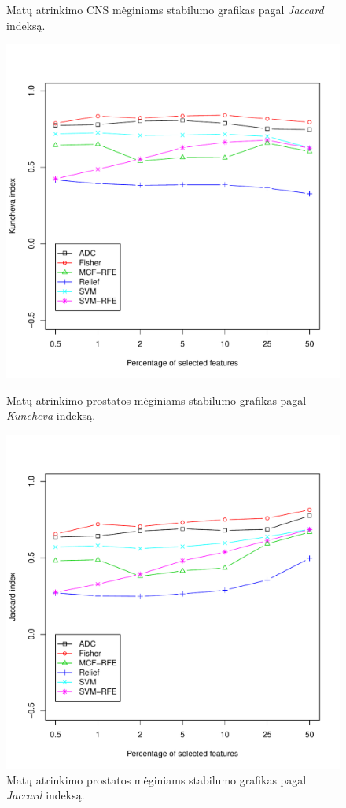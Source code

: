 \begin{figure}[H]
\begin{minipage}[b]{0.47\linewidth}
\caption{Matų atrinkimo CNS mėginiams stabilumo grafikas pagal \textit{Jaccard} indeksą.}
\label{fig:robj_cns}
\end{minipage}
\hspace{0.2cm}
\begin{minipage}[b]{0.47\linewidth}
\centering
\includegraphics[width=.85\textwidth]{../bachelor/images/prostate_robustness_kuncheva.pdf}
\caption{Matų atrinkimo prostatos mėginiams stabilumo grafikas pagal \textit{Kuncheva} indeksą.}
\label{fig:robk_prostate}
\end{minipage}
\hspace{0.2cm}
\begin{minipage}[b]{0.47\linewidth}
\centering
\includegraphics[width=.85\textwidth]{../bachelor/images/prostate_robustness_jaccard.pdf}
\caption{Matų atrinkimo prostatos mėginiams stabilumo grafikas pagal \textit{Jaccard} indeksą.}
\label{fig:robj_prostate}
\end{minipage}
\end{figure}
